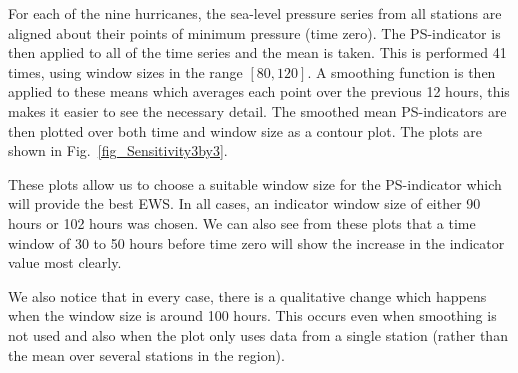 \documentclass[%
aip,
amsmath,amssymb,
reprint,%
]{revtex4-1}
\begin{document}
For each of the nine hurricanes, the sea-level pressure series from all stations are aligned about their points of minimum pressure (time zero). The PS-indicator is then applied to all of the time series and the mean is taken. This is performed 41 times, using window sizes in the range $[80,120]$. A smoothing function is then applied to these means which averages each point over the previous 12 hours, this makes it easier to see the necessary detail. The smoothed mean PS-indicators are then plotted over both time and window size as a contour plot. The plots are shown in Fig.~\ref{fig_Sensitivity3by3}. 

These plots allow us to choose a suitable window size for the PS-indicator which will provide the best EWS. In all cases, an indicator window size of either 90 hours or 102 hours was chosen. We can also see from these plots that a time window of 30 to 50 hours before time zero will show the increase in the indicator value most clearly.

We also notice that in every case, there is a qualitative change which happens when the window size is around 100 hours. This occurs even when smoothing is not used and also when the plot only uses data from a single station (rather than the mean over several stations in the region). 
\end{document}
